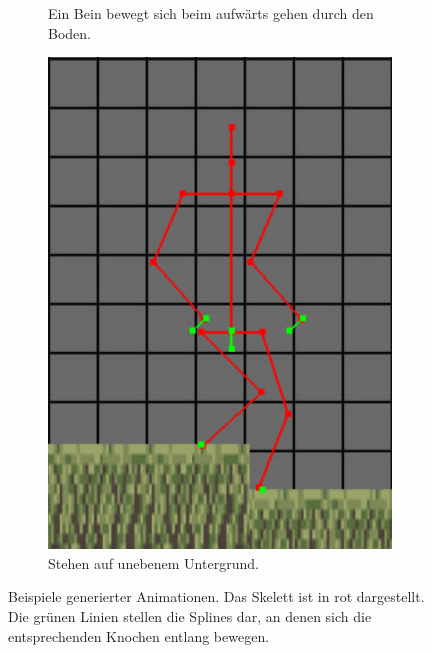 \begin{figure}
\begin{subfigure}[t]{.4\linewidth}
        \caption{Ein Bein bewegt sich beim aufwärts gehen durch den Boden.}
        \label{clip_through_ground}
    \end{subfigure}
    \begin{subfigure}[t]{.4\linewidth}
        \centering
        \includegraphics[width=0.75\linewidth]{images/standing_uneven.png}
        \caption{Stehen auf unebenem Untergrund.}
        \label{standing_uneven}
    \end{subfigure}
    \caption{Beispiele generierter Animationen. Das Skelett ist in rot dargestellt. Die grünen Linien stellen die Splines dar, an denen sich die entsprechenden Knochen entlang bewegen.}
\end{figure}
